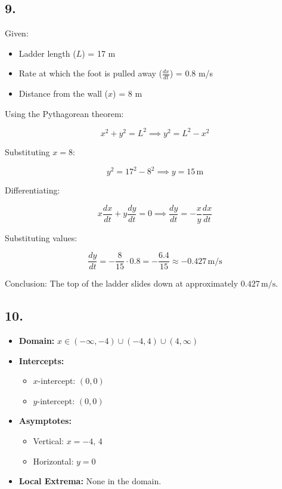 \documentclass[a4paper, 7pt]{article}
\begin{document}
\subsection*{9.}
Given:
\begin{itemize}
    \item Ladder length (\(L\)) = 17 m
    \item Rate at which the foot is pulled away (\(\frac{dx}{dt}\)) = 0.8 m/s
    \item Distance from the wall (\(x\)) = 8 m
\end{itemize}

Using the Pythagorean theorem:

\[
x^2 + y^2 = L^2 \implies y^2 = L^2 - x^2
\]

Substituting \(x = 8\):

\[
y^2 = 17^2 - 8^2 \implies y = 15 \, \text{m}
\]

Differentiating:

\[
x \frac{dx}{dt} + y \frac{dy}{dt} = 0 \implies \frac{dy}{dt} = -\frac{x}{y} \frac{dx}{dt}
\]

Substituting values:

\[
\frac{dy}{dt} = -\frac{8}{15} \cdot 0.8 = -\frac{6.4}{15} \approx -0.427 \, \text{m/s}
\]

Conclusion: The top of the ladder slides down at approximately \(0.427 \, \text{m/s}\).
\subsection*{10.}

\begin{itemize}
    \item \textbf{Domain:} \( x \in (-\infty, -4) \cup (-4, 4) \cup (4, \infty) \)
    \item \textbf{Intercepts:}
        \begin{itemize}
            \item \( x \)-intercept: \( (0, 0) \)
            \item \( y \)-intercept: \( (0, 0) \)
        \end{itemize}
    \item \textbf{Asymptotes:}
        \begin{itemize}
            \item Vertical: \( x = -4, \, 4 \)
            \item Horizontal: \( y = 0 \)
        \end{itemize}
    \item \textbf{Local Extrema:} None in the domain.
\end{itemize}
\end{document}
